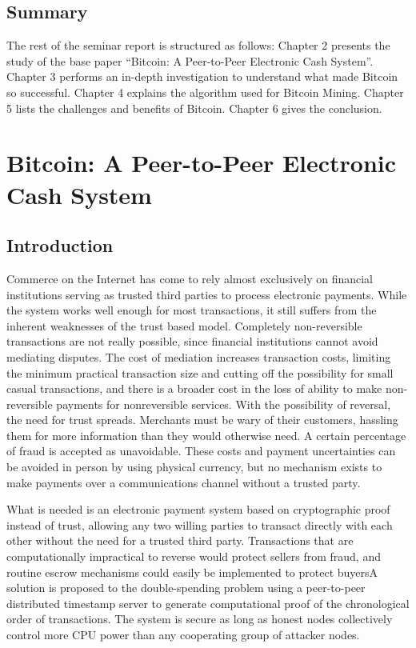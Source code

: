 \section{Summary}
The rest of the seminar report is structured as follows: Chapter 2 presents the
study of the base paper “Bitcoin: A Peer-to-Peer Electronic Cash System”. 
Chapter 3 performs an in-depth investigation to understand what made Bitcoin so 
successful. Chapter 4 explains the algorithm used for Bitcoin Mining. Chapter 5 
lists the challenges and benefits of Bitcoin. Chapter 6 gives the conclusion.

%
%

\chapter{Bitcoin: A Peer-to-Peer Electronic Cash System}
\section{Introduction}

Commerce on the Internet has come to rely almost exclusively on financial institutions serving as
trusted third parties to process electronic payments. While the system works well enough for
most transactions, it still suffers from the inherent weaknesses of the trust based model.
Completely non-reversible transactions are not really possible, since financial institutions cannot
avoid mediating disputes. The cost of mediation increases transaction costs, limiting the
minimum practical transaction size and cutting off the possibility for small casual transactions,
and there is a broader cost in the loss of ability to make non-reversible payments for nonreversible
services. With the possibility of reversal, the need for trust spreads. Merchants must
be wary of their customers, hassling them for more information than they would otherwise need.
A certain percentage of fraud is accepted as unavoidable. These costs and payment uncertainties
can be avoided in person by using physical currency, but no mechanism exists to make payments
over a communications channel without a trusted party.

What is needed is an electronic payment system based on cryptographic proof instead of trust,
allowing any two willing parties to transact directly with each other without the need for a trusted
third party. Transactions that are computationally impractical to reverse would protect sellers
from fraud, and routine escrow mechanisms could easily be implemented to protect buyersA solution is proposed  to the double-spending problem using a peer-to-peer distributed
timestamp server to generate computational proof of the chronological order of transactions. The
system is secure as long as honest nodes collectively control more CPU power than any
cooperating group of attacker nodes.

